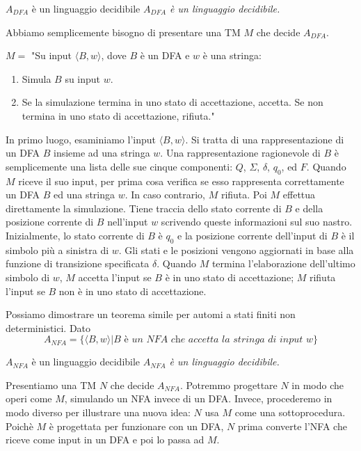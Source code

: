 \begin{Thm}{$A_{DFA}$ è un linguaggio decidibile}{}\label{thm:adfa-decidibile}
\textit{$A_{DFA}$ è un linguaggio decidibile.}

\begin{osservation}
Abbiamo semplicemente bisogno di presentare una TM $M$ che decide $A_{DFA}$.

$M =$ "Su input $\langle B, w\rangle $, dove $B$ è un DFA e $w$ è una stringa:
\begin{enumerate}
    \item Simula $B$ su input $w$.
    \item Se la simulazione termina in uno stato di accettazione, accetta. Se non termina in uno stato di accettazione, rifiuta."
\end{enumerate}    
\end{osservation}

\begin{demonstration}
In primo luogo, esaminiamo l'input $\langle B, w\rangle $. Si tratta di una rappresentazione di un DFA $B$ insieme ad una stringa $w$. Una rappresentazione ragionevole di $B$ è semplicemente una lista delle sue cinque componenti: $Q$, $\Sigma$, $\delta$, $q_0$, ed $F$. Quando $M$ riceve il suo input, per prima cosa verifica se esso rappresenta correttamente un DFA $B$ ed una stringa $w$. In caso contrario, $M$ rifiuta. Poi $M$ effettua direttamente la simulazione. Tiene traccia dello stato corrente di $B$ e della posizione corrente di $B$ nell'input $w$ scrivendo queste informazioni sul suo nastro. Inizialmente, lo stato corrente di $B$ è $q_0$ e la posizione corrente dell'input di $B$ è il simbolo più a sinistra di $w$. Gli stati e le posizioni vengono aggiornati in base alla funzione di transizione specificata $\delta$. Quando $M$ termina l'elaborazione dell'ultimo simbolo di $w$, $M$ accetta l'input se $B$ è in uno stato di accettazione; $M$ rifiuta l'input se $B$ non è in uno stato di accettazione.
\end{demonstration}
\end{Thm}

Possiamo dimostrare un teorema simile per automi a stati finiti non deterministici. Dato
\begin{equation*}
A_{NFA} = \{\langle B,w\rangle  | B \textit{ è un NFA che accetta la stringa di input }w\}
\end{equation*}

\begin{Thm}{$A_{NFA}$ è un linguaggio decidibile}{}\label{thm:anfa-decidibile}
\textit{$A_{NFA}$ è un linguaggio decidibile.}

\begin{demonstration}
Presentiamo una TM $N$ che decide $A_{NFA}$. Potremmo progettare $N$ in modo che operi come $M$, simulando un NFA invece di un DFA. Invece, procederemo in modo diverso per illustrare una nuova idea: $N$ usa $M$ come una sottoprocedura. Poichè $M$ è progettata per funzionare con un DFA, $N$ prima converte l'NFA che riceve come input in un DFA e poi lo passa ad $M$.
\end{demonstration}    
\end{Thm}

